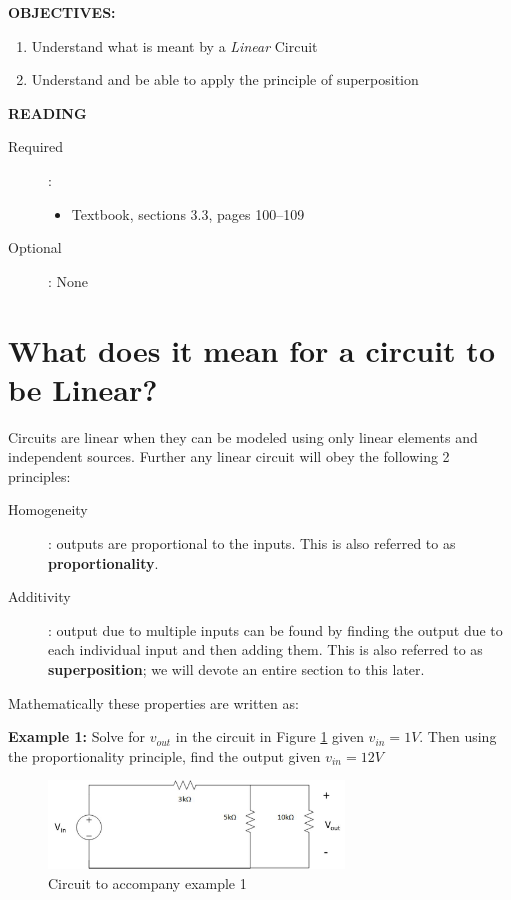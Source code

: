 \documentclass{handout}
\begin{document}
\maketitle


\textbf{OBJECTIVES:}
\begin{enumerate}
\item Understand what is meant by a {\em Linear} Circuit
\item Understand and be able to apply the principle of superposition
\end{enumerate}

\textbf{READING}
\begin{description}
\item [Required]:
\begin{itemize}
\item  Textbook, sections 3.3, pages 100--109
\end{itemize}
\item [Optional]: None
\end{description}


\section{What does it mean for a circuit to be Linear?}
Circuits are linear when they can be modeled using only linear elements and independent sources.  Further any linear circuit will obey the following 2 principles:
\begin{description}
\item[Homogeneity]: outputs are proportional to the inputs. This is also referred to as \textbf{proportionality}.
\item[Additivity]: output due to multiple inputs can be found by finding the output due to each individual input and then adding them.  This is also referred to as \textbf{superposition}; we will devote an entire section to this later.
\end{description}

Mathematically these properties are written as:

\newpage
\clearpage
\pagebreak

\textbf{Example 1:} Solve for $v_{out}$ in the circuit in Figure \ref{fig: Example1} given $v_{in} = 1V$.  Then using the proportionality principle, find the output given  $v_{in}=12V$
\begin{figure} [h t b]
\centering
\includegraphics[width=0.7\textwidth]{Example1.jpg}
\caption{Circuit to accompany example 1}
\label{fig: Example1}
\end{figure}
\end{document}

